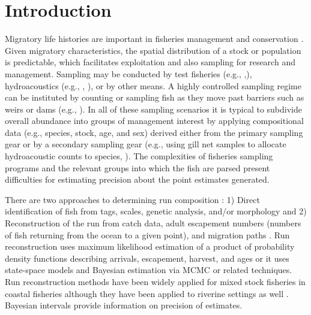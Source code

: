\documentclass[11pt]{article}
\begin{document}
\section{Introduction}
Migratory life histories are important in fisheries management and conservation  \cite{Hilborn1992,McDowall2009}. Given migratory characteristics, the spatial distribution of a stock or population is predictable, which facilitates exploitation and also sampling for research and management. Sampling may be conducted by test fisheries (e.g., ,), hydroacoustics (e.g., , ), or by other means. A highly controlled sampling regime can be instituted by counting or sampling fish as they move past barriers such as weirs or dams (e.g., ). In all of these sampling scenarios it is typical to subdivide overall abundance into groups of management interest by applying compositional data (e.g., species, stock, age, and sex) derived either from the primary sampling gear or by a secondary sampling gear (e.g., using gill net samples to allocate hydroacoustic counts to species, ). The complexities of fisheries sampling programs and the relevant groups into which the fish are parsed present difficulties for estimating precision about the point estimates generated.

There are two approaches to determining run composition \cite{Starr1988}: 1) Direct identification of fish from tags, scales, genetic analysis, and/or morphology and 2) Reconstruction of the run from catch data, adult escapement numbers (numbers of fish returning from the ocean to a given point), and migration paths \cite{Prevost2005,Flynn2006,Buckland2007,Chasco2007,Newman2009,Branch2010}.  Run reconstruction uses maximum likelihood estimation of a product of probability density functions describing arrivals, escapement, harvest, and ages or it uses state-space models and Bayesian estimation via MCMC or related techniques. Run reconstruction methods have been widely applied for mixed stock fisheries in coastal fisheries although they have been applied to riverine settings as well \cite{Eggers2011,Pritt2013}.  Bayesian intervals provide information on precision of estimates.
\end{document}
